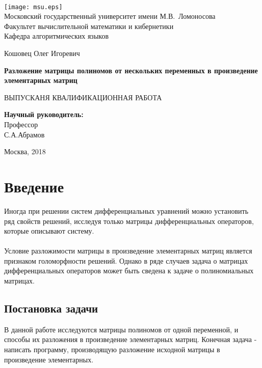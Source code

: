 \documentclass[14pt, a4paper]{extreport}
\begin{document}
\thispagestyle{empty}

\begin{center}
\ \vspace{-3cm}

\texttt{[image: msu.eps]}\\
{Московский государственный университет имени М.В.~Ломоносова}\\
Факультет вычислительной математики и кибернетики\\
Кафедра алгоритмических языков

\vspace{5cm}

{\Large Кошовец Олег Игоревич}

\vspace{1cm}

{\Large\bfseries
Разложение матрицы полиномов от нескольких переменных в произведение элементарных матриц\\}

\vspace{1cm}

{\large ВЫПУСКАНЯ КВАЛИФИКАЦИОННАЯ РАБОТА}
\end{center}

\vfill

\begin{flushright}
  \textbf{Научный руководитель:}\\
  Профессор\\
  С.А.Абрамов
\end{flushright}

\vfill


\begin{center}
Москва, 2018
\end{center}
\newpage

	\chapter{Введение}
		Иногда при решении систем дифференциальных уравнений можно установить ряд
		свойств решений, исследуя только матрицы дифференциальных операторов,
		которые описывают систему.
		\\\\
		Условие разложимости матрицы в произведение элементарных матриц является
		признаком голоморфности решений.
		Однако в ряде случаев задача о матрицах дифференциальных операторов
		может быть сведена к задаче о полиномиальных матрицах.
		\section{Постановка задачи}
		В данной работе исследуются матрицы полиномов от одной переменной,
		и способы их разложения в произведение элементарных матриц.
		Конечная задача - написать программу, производящую разложение
		исходной матрицы в произведение элементарных.
	\newpage
\end{document}
